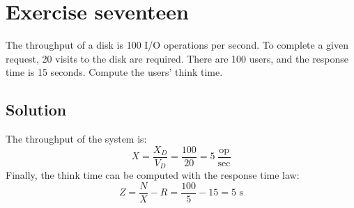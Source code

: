 \section{Exercise seventeen}

The throughput of a disk is 100 I/O operations per second.
To complete a given request, 20 visits to the disk are required. 
There are 100 users, and the response time is 15 seconds. 
Compute the users' think time.

\subsection*{Solution}
The throughput of the system is:
\[X=\dfrac{X_D}{V_D}=\dfrac{100}{20}=5\:\dfrac{\text{op}}{{\text{sec}}}\]
Finally, the think time can be computed with the response time law:
\[Z=\dfrac{N}{X}-R=\dfrac{100}{5}-15=5\text{ s}\]